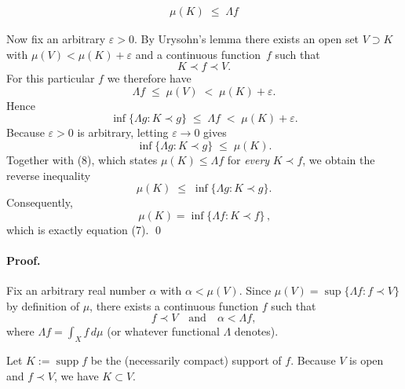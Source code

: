 \documentclass[12pt]{article}
\title{}
\author{Jerich Lee}
\date{\today}
\theoremstyle{definition} %
\theoremstyle{plain} %
\begin{document}
\maketitle

\begin{align}
  \mu(K) \;\le\; \Lambda f \tag{8}
\end{align}

\noindent
Now fix an arbitrary $\varepsilon>0$.  
By Urysohn’s lemma there exists an open set $V\supset K$ with  
$\mu(V)<\mu(K)+\varepsilon$ and a continuous function  
$\,f$ such that
\[
  K \prec f \prec V .
\]
For this particular $f$ we therefore have  
\[
  \Lambda f \;\le\; \mu(V) \;<\; \mu(K)+\varepsilon .
\]
Hence
\[
  \inf\{\Lambda g : K \prec g\}\;\le\;\Lambda f
  \;<\;\mu(K)+\varepsilon .
\]
Because $\varepsilon>0$ is arbitrary, letting $\varepsilon\to 0$ gives  
\[
  \inf\{\Lambda g : K \prec g\}\;\le\;\mu(K).
\]
Together with (8), which states $\mu(K)\le\Lambda f$ for \emph{every}  
$K\prec f$, we obtain the reverse inequality
\[
  \mu(K)\;\le\;\inf\{\Lambda g : K \prec g\}.
\]
Consequently,
\[
  \boxed{\,
     \mu(K)=\inf\{\Lambda f : K \prec f\}
  \,},
\]
which is exactly equation (7).  \qed
\pagebreak
%
%

\paragraph{Proof.}
Fix an arbitrary real number $\alpha$ with $\alpha<\mu(V)$.  
Since $\mu(V)=\sup\{\Lambda f: f\prec V\}$ by definition of $\mu$,  
there exists a continuous function $f$ such that  
\[
      f\prec V
      \quad\text{and}\quad
      \alpha<\Lambda f,
\]
where $\Lambda f=\int_X f\,d\mu$ (or whatever functional $\Lambda$ denotes).

\medskip
Let $K:=\operatorname{supp}f$ be the (necessarily compact) support of $f$.  
Because $V$ is open and $f\prec V$, we have $K\subset V$.
\end{document}
